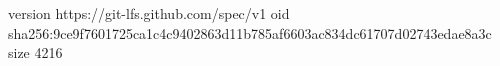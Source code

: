 version https://git-lfs.github.com/spec/v1
oid sha256:9ce9f7601725ca1c4c9402863d11b785af6603ac834dc61707d02743edae8a3c
size 4216
